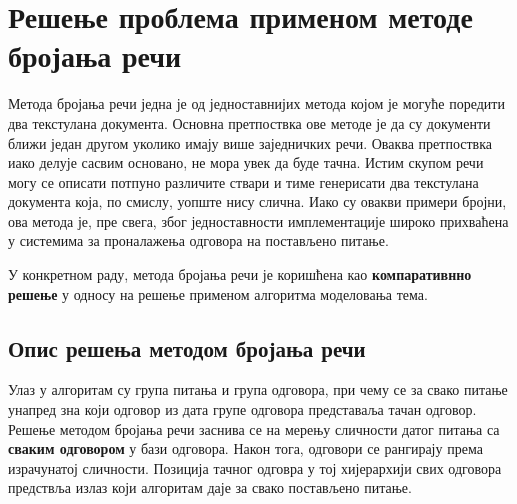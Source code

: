 \chapter{Решење проблема применом методе бројања речи}

Метода бројања речи једна је од једноставнијих метода којом  је могуће поредити два текстулана документа.  Основна претпоствка ове методе је да су документи ближи један другом уколико  имају више заједничких речи.  Оваква претпоствка иако делује сасвим основано, не мора увек да буде тачна. Истим скупом речи могу се описати потпуно различите ствари и тиме генерисати два текстулана документа која, по смислу, уопште нису слична. Иако су овакви примери бројни, ова метода је, пре свега, због једноставности имплементације широко прихваћена у системима за проналажења одговора на постављено питање.

У конкретном раду, метода бројања речи је коришћена као \textbf{компаративнно решење} у односу на решење применом алгоритма моделовања тема. 

\section{Опис решења методом бројања речи}

Улаз у алгоритам су група питања и група одговора, при чему се за свако питање унапред зна који одговор из дата групе одговора представаља тачан одговор. Решење методом бројања речи заснива се на мерењу сличности датог  питања са \textbf{сваким одговором} у бази одговора. Након тога, одговори се рангирају према израчунатој сличности. Позиција тачног одговра у тој хијерархији свих одговора предствља излаз који алгоритам даје за свако постављено питање. 

  